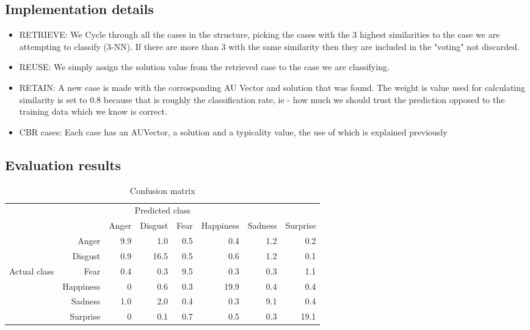 \documentclass[12pt]{article}
\begin{document}
\subsection*{Implementation details}
\begin{itemize}
  \item RETRIEVE:
    We Cycle through all the cases in the structure, picking the cases with the 3 highest similarities to the case we are attempting to classify (3-NN). If there are more than 3 with the same similarity then they are included in the "voting" not discarded.
  \item REUSE:
    We simply assign the solution value from the retrieved case to the case we are classifying.
  \item RETAIN:
    A new case is made with the corrosponding AU Vector and solution that was found. The weight is value used for calculating similarity is set to 0.8 because that is roughly the classification rate, ie - how much we should trust the prediction opposed to the training data which we know is correct.
  \item CBR cases:
    Each case has an AUVector, a solution and a typicality value, the use of which is explained previously
\end{itemize}


\subsection*{Evaluation results}

\begin{table}
\centering
\begin{tabular}{r r | r r r r r r}
\multicolumn{8}{c}{Predicted class} \\
&  & Anger & Disgust & Fear & Happiness & Sadness & Surprise \\
\hline
 & Anger            & 9.9 & 1.0  & 0.5 & 0.4  & 1.2 & 0.2  \\
 & Disgust          & 0.9 & 16.5 & 0.5 & 0.6  & 1.2 & 0.1  \\
Actual class & Fear & 0.4 & 0.3  & 9.5 & 0.3  & 0.3 & 1.1  \\
 & Happiness        & 0   & 0.6  & 0.3 & 19.9 & 0.4 & 0.4  \\
 & Sadness          & 1.0 & 2.0  & 0.4 & 0.3  & 9.1 & 0.4  \\
 & Surprise         & 0   & 0.1  & 0.7 & 0.5  & 0.3 & 19.1 \\
\end{tabular} 
\caption{Confusion matrix}
\end{table}
\end{document}
